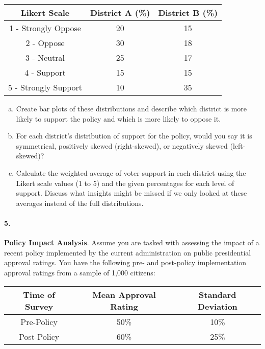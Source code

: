 \documentclass{article}
\begin{document}
\begin{center} 
\begin{tabular}{|c|c|c|} 
\hline Likert Scale & District A (\%) & District B (\%) \\ 
\hline 
1 - Strongly Oppose & 20 & 15 \\
2 - Oppose & 30 & 18 \\
3 - Neutral & 25 & 17 \\
4 - Support & 15 & 15 \\
5 - Strongly Support & 10 & 35 \\
\hline 
\end{tabular} 
\end{center}

\begin{enumerate}[a)]
    \item Create bar plots of these distributions and describe which district is more likely to support the policy and which is more likely to oppose it.
    \item For each district's distribution of support for the policy, would you say it is symmetrical, positively skewed (right-skewed), or negatively skewed (left-skewed)?
    \item Calculate the weighted average of voter support in each district using the Likert scale values (1 to 5) and the given percentages for each level of support. Discuss what insights might be missed if we only looked at these averages instead of the full distributions.
\end{enumerate}


\paragraph{5.} \textbf{Policy Impact Analysis}. 
Assume you are tasked with assessing the impact of a recent policy implemented by the current administration on public presidential approval ratings. You have the following pre- and post-policy implementation approval ratings from a sample of 1,000 citizens:
\begin{center}
    \begin{tabular}{|c|c|c|}
    \hline
    Time of Survey & Mean Approval Rating & Standard Deviation \\
    \hline
    Pre-Policy & 50\% & 10\% \\
    Post-Policy & 60\% & 25\% \\
    \hline
    \end{tabular}
\end{center}
\end{document}
